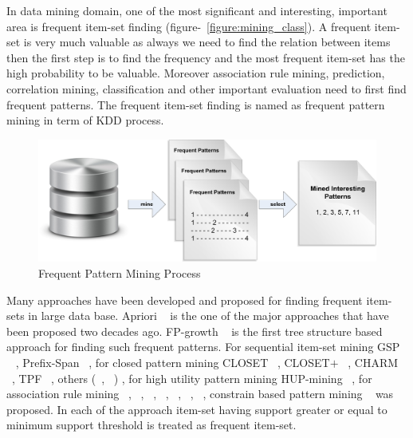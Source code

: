 In data mining domain, one of the most significant and interesting, important area is frequent item-set finding (figure-~\ref{figure:mining_class}). A frequent item-set is very much valuable as always we need to find the relation between items then the first step is to find the frequency and the most frequent item-set has the high probability to be valuable. Moreover association rule mining, prediction, correlation mining, classification and other important evaluation need to first find frequent patterns. The frequent item-set finding is named as frequent pattern mining in term of KDD process.\\
\begin{figure}
\centering
  \includegraphics[width=.9\textwidth]{images/frequent_flow.jpg}
\caption{Frequent Pattern Mining Process}
\label{figure:frequent_flow}
\end{figure}
Many approaches have been developed and proposed for finding frequent item-sets in large data base. Apriori ~\cite{apriori} is the one of the major approaches that have been proposed two decades ago. FP-growth ~\cite{fp_growth} is the first tree structure based approach for finding such frequent patterns. For sequential item-set mining GSP ~\cite{gsp} , Prefix-Span ~\cite{prefix_span}, for closed pattern mining CLOSET ~\cite{closet}, CLOSET$+$ ~\cite{closet_plus}, CHARM ~\cite{charm}, TPF ~\cite{tpf}, others (~\cite{close_1}, ~\cite{close_2}) , for high utility pattern mining HUP-mining ~\cite{hup_mining}, for association rule mining ~\cite{ass_01}, ~\cite{ass_02}, ~\cite{ass_03}, ~\cite{ass_04}, ~\cite{ass_05}, ~\cite{ass_06}, ~\cite{ass_07}, constrain based pattern mining ~\cite{const_01} was proposed. In each of the approach item-set having support greater or equal to minimum support threshold is treated as frequent item-set.

